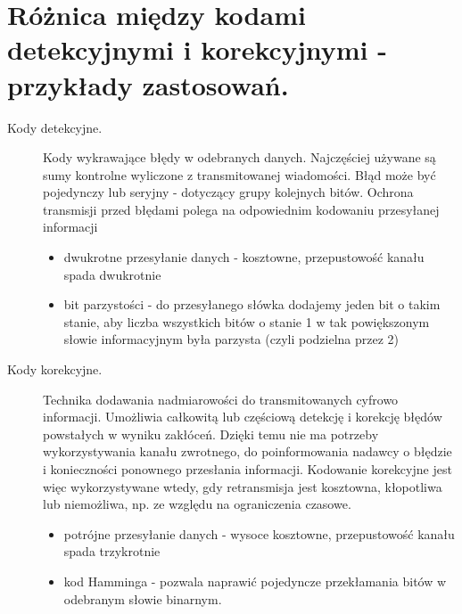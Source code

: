 \documentclass[12pt,a4paper]{article}
\begin{document}
	\section{Różnica między kodami detekcyjnymi i korekcyjnymi - przykłady zastosowań.}
	\begin{description}
		\item[Kody detekcyjne.] Kody wykrawające błędy w odebranych danych. Najczęściej używane są sumy kontrolne wyliczone z transmitowanej wiadomości. Błąd może być pojedynczy lub seryjny - dotyczący grupy kolejnych bitów. Ochrona transmisji przed błędami polega na odpowiednim kodowaniu przesyłanej informacji
		\begin{itemize}
			\item dwukrotne przesyłanie danych - kosztowne, przepustowość kanału spada dwukrotnie
			\item bit parzystości - do przesyłanego słówka dodajemy jeden bit o takim stanie, aby liczba wszystkich bitów o stanie 1 w tak powiększonym słowie informacyjnym była parzysta (czyli podzielna przez 2)
		\end{itemize}
		\item[Kody korekcyjne.] Technika dodawania nadmiarowości do transmitowanych cyfrowo informacji. Umożliwia całkowitą lub częściową detekcję i korekcję błędów powstałych w wyniku zakłóceń. Dzięki temu nie ma potrzeby wykorzystywania kanału zwrotnego, do poinformowania nadawcy o błędzie i konieczności ponownego przesłania informacji. Kodowanie korekcyjne jest więc wykorzystywane wtedy, gdy retransmisja jest kosztowna, kłopotliwa lub niemożliwa, np. ze względu na ograniczenia czasowe.
		\begin{itemize}
			\item potrójne przesyłanie danych - wysoce kosztowne, przepustowość kanału spada trzykrotnie
			\item kod Hamminga - pozwala naprawić pojedyncze przekłamania bitów w odebranym słowie binarnym. 
		\end{itemize}
	\end{description}
\end{document}
